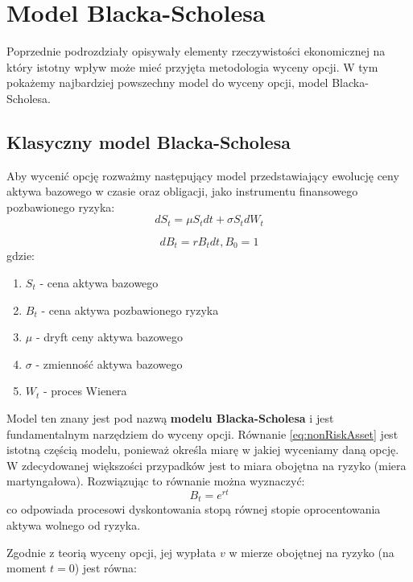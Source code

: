 \documentclass{pracamgr}
\begin{document}
\section{Model Blacka-Scholesa}

Poprzednie podrozdziały opisywały elementy rzeczywistości ekonomicznej na który istotny wpływ może mieć przyjęta 
metodologia wyceny opcji. W tym pokażemy najbardziej powszechny model do wyceny opcji, 
model Blacka-Scholesa. 
\subsection{Klasyczny model Blacka-Scholesa} %
\label{sub:subsection_name}

Aby wycenić opcję rozważmy następujący model przedstawiający ewolucję ceny aktywa
bazowego w czasie oraz obligacji, jako instrumentu finansowego pozbawionego ryzyka:
\begin{equation}
  \label{eq:asset}
  dS_t = \mu S_t dt + \sigma S_t d W_t 
\end{equation}

\begin{equation}
  \label{eq:nonRiskAsset}
  dB_t = r B_t dt, B_0 = 1
\end{equation}
gdzie:
\begin{enumerate}
  \item $S_t$ - cena aktywa bazowego
  \item $B_t$ - cena aktywa pozbawionego ryzyka
  \item $\mu$ - dryft ceny aktywa bazowego
  \item $\sigma$ - zmienność aktywa bazowego
  \item $W_t$ - proces Wienera
\end{enumerate}


Model ten znany jest pod nazwą \textbf{modelu Blacka-Scholesa} i jest fundamentalnym narzędziem do wyceny opcji.
Równanie \ref{eq:nonRiskAsset}  jest istotną częścią modelu, ponieważ określa miarę w jakiej wyceniamy daną opcję.
W zdecydowanej większości przypadków jest to miara obojętna na ryzyko (miera martyngałowa). 
Rozwiązując to równanie można wyznaczyć:
\begin{equation}
B_t = e^{rt}
\end{equation}
co odpowiada procesowi dyskontowania stopą równej stopie oprocentowania aktywa wolnego od ryzyka.

Zgodnie z teorią wyceny opcji, jej wypłata $v$ w mierze obojętnej na ryzyko (na moment $t = 0$) jest równa:
\end{document}

